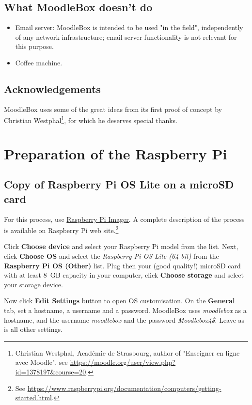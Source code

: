 \documentclass[12pt]{article}
\begin{document}
\subsection{What MoodleBox doesn't do}

\begin{itemize}
\item Email server: MoodleBox is intended to be used "in the field", independently of any network infrastructure; email server functionality is not relevant for this purpose.
\item Coffee machine.
\end{itemize}

\subsection{Acknowledgements}

MoodleBox uses some of the great ideas from its first proof of concept by Christian Westphal\footnote{Christian Westphal, Académie de Strasbourg, author of "Enseigner en ligne avec Moodle", see \url{https://moodle.org/user/view.php?id=1378197&course=20}.}, for which he deserves special thanks.

\section{Preparation of the Raspberry Pi}

\subsection{Copy of Raspberry Pi OS Lite on a microSD card}

For this process, use \href{https://www.raspberrypi.com/software/}{Raspberry Pi Imager}.
A complete description of the process is available on Raspberry Pi web site.\footnote{See \url{https://www.raspberrypi.org/documentation/computers/getting-started.html}.}

Click \textbf{Choose device} and select your Raspberry Pi model from the list.
Next, click \textbf{Choose OS} and select the \emph{Raspberry Pi OS Lite (64-bit)} from the \textbf{Raspberry Pi OS (Other)} list.
Plug then your (good quality!) microSD card with at least 8~GB capacity in your computer, click \textbf{Choose storage} and select your storage device.

Now click \textbf{Edit Settings} button to open OS customisation.
On the \textbf{General} tab, set a hostname, a username and a password.
MoodleBox uses \emph{moodlebox} as a hostname, and the username \emph{moodlebox} and the password \emph{Moodlebox4\$}.
Leave as is all other settings.\label{page-credentials}
\end{document}
